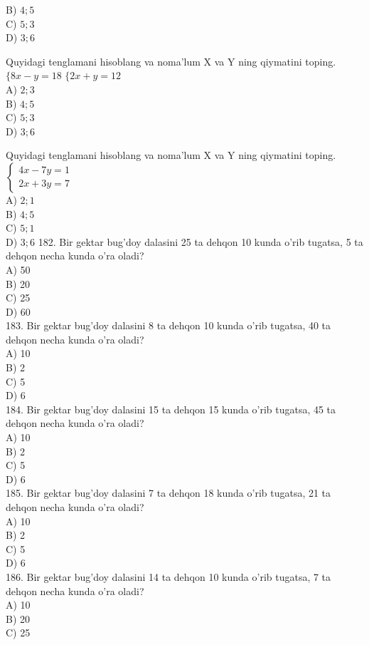B) $4 ; 5$\\
C) $5 ; 3$\\
D) $3 ; 6$
  \item Quyidagi tenglamani hisoblang va noma'lum X va Y ning qiymatini toping. $\{8 x-y=18$ $\{2 x+y=12$\\
A) $2 ; 3$\\
B) $4 ; 5$\\
C) $5 ; 3$\\
D) $3 ; 6$
  \item Quyidagi tenglamani hisoblang va noma'lum X va Y ning qiymatini toping. $\left\{\begin{array}{l}4 x-7 y=1 \\ 2 x+3 y=7\end{array}\right.$\\
A) $2 ; 1$\\
B) $4 ; 5$\\
C) $5 ; 1$\\
D) $3 ; 6$
182. Bir gektar bug'doy dalasini 25 ta dehqon 10 kunda o'rib tugatsa, 5 ta dehqon necha kunda o'ra oladi?\\
A) 50\\
B) 20\\
C) 25\\
D) 60\\
183. Bir gektar bug'doy dalasini 8 ta dehqon 10 kunda o'rib tugatsa, 40 ta dehqon necha kunda o'ra oladi?\\
A) 10\\
B) 2\\
C) 5\\
D) 6\\
184. Bir gektar bug'doy dalasini 15 ta dehqon 15 kunda o'rib tugatsa, 45 ta dehqon necha kunda o'ra oladi?\\
A) 10\\
B) 2\\
C) 5\\
D) 6\\
185. Bir gektar bug'doy dalasini 7 ta dehqon 18 kunda o'rib tugatsa, 21 ta dehqon necha kunda o'ra oladi?\\
A) 10\\
B) 2\\
C) 5\\
D) 6\\
186. Bir gektar bug'doy dalasini 14 ta dehqon 10 kunda o'rib tugatsa, 7 ta dehqon necha kunda o'ra oladi?\\
A) 10\\
B) 20\\
C) 25\\
